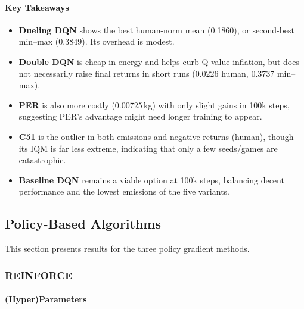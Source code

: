 \paragraph{Key Takeaways}
\begin{itemize}
	\item \textbf{Dueling DQN} shows the best human-norm mean (0.1860), 
	or second-best min--max (0.3849). Its overhead is modest.
	\item \textbf{Double DQN} is cheap in energy and helps curb Q-value inflation, 
	but does not necessarily raise final returns in short runs (0.0226 human, 0.3737 min--max).
	\item \textbf{PER} is also more costly (0.00725\,kg) with only slight gains in 100k steps, 
	suggesting PER’s advantage might need longer training to appear.
	\item \textbf{C51} is the outlier in both emissions and negative returns (human), 
	though its IQM is far less extreme, indicating that only a few seeds/games are catastrophic.
	\item \textbf{Baseline DQN} remains a viable option at 100k steps, 
	balancing decent performance and the lowest emissions of the five variants.
\end{itemize}


\subsection{Policy-Based Algorithms}
This section presents results for the three policy gradient methods.

\subsubsection{REINFORCE}
\label{subsubsec:reinforce}

\paragraph{(Hyper)Parameters}

